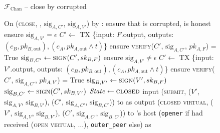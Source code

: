 \begin{figure}[H]
  \begin{systembox}{$\mathcal{F}_{\mathrm{Chan}}$ -- close by corrupted}
    \begin{algorithmic}[1]
      \State On (\textsc{close}, \alice, $\mathrm{sig}_{A, C'}$,
      $\mathrm{sig}_{A, V'}$) by \adversary:
      \Indent
        \State {}
        \State ensure that \alice is corrupted, \bob is honest
          \State ensure $\mathrm{sig}_{A, V'} = \epsilon$
          \State $C' \gets$ TX \{input: $F$.output, outputs: $(c_B, pk_{B,
          \mathrm{out}}), (c_A, pk_{A, \mathrm{out}} \wedge t)$\}
          \State ensure \textsc{verify}($C'$, $\mathrm{sig}_{A, C'}$, $pk_{A, F}$)
          = True
          \State $\mathrm{sig}_{B, C'} \gets \textsc{sign}(C', sk_{B, F})$
        \Else
          \State ensure $\mathrm{sig}_{A, V'} \neq \epsilon$
          \State {}
          \State $C' \gets$ TX \{input: $V'$.output, outputs: $(c_B, pk_{B,
          \mathrm{out}}), (c_A, pk_{A, \mathrm{out}} \wedge t)$\}
          \State ensure \textsc{verify}($C'$, $\mathrm{sig}_{A, C'}$, $pk_{A,
          V'}$) = True
          \State $\mathrm{sig}_{B, V'} \gets \textsc{sign}(V', sk_{B, F})$
          \State $\mathrm{sig}_{B, C'} \gets \textsc{sign}(C', sk_{B, V'})$
        \EndIf
        \State $\mathit{State} \gets \textsc{closed}$
          \State input (\textsc{submit}, ($V'$, $\mathrm{sig}_{A, V}$,
          $\mathrm{sig}_{B, V'}$), ($C'$, $\mathrm{sig}_{A, C'}$,
          $\mathrm{sig}_{B, C'}$)) to \ledger as \alice
        \Else
          \State output (\textsc{closed virtual}, ($V'$, $\mathrm{sig}_{A, V}$,
          $\mathrm{sig}_{B, V'}$), ($C'$, $\mathrm{sig}_{A, C'}$,
          $\mathrm{sig}_{B, C'}$)) to \alice's host (\texttt{opener} if \alice
          had received (\textsc{open virtual}, $\dots$), \texttt{outer\_peer}
          else) as \alice
        \EndIf
      \EndIndent
    \end{algorithmic}
  \end{systembox}
  \caption{}
  \label{code:functionality:chan:skeleton:close:corrupted}
\end{figure}

